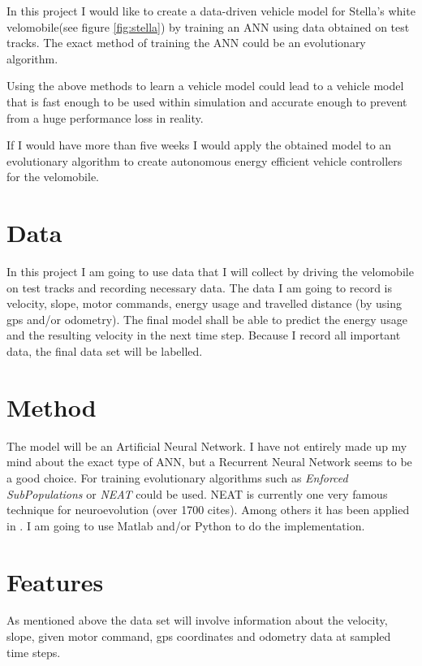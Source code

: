\documentclass[	DIV=calc,%
				paper=a4,%
				fontsize=11pt,%
				twocolumn]{scrartcl}	 %
\begin{document}
	In this project I would like to create a data-driven vehicle model for Stella's white velomobile(see figure \ref{fig:stella}) by training an ANN using data obtained on test tracks.
	The exact method of training the ANN could be an evolutionary algorithm.
	
	Using the above methods to learn a vehicle model could lead to a vehicle model that is fast enough to be used within simulation and accurate enough to prevent from a huge performance loss in reality.
	
	If I would have more than five weeks I would apply the obtained model to an evolutionary algorithm to create autonomous energy efficient vehicle controllers for the velomobile.
	

\section{Data}

    
    In this project I am going to use data that I will collect by driving the velomobile on test tracks and recording necessary data.
    The data I am going to record is velocity, slope, motor commands, energy usage and travelled distance (by using gps and/or odometry).
    The final model shall be able to predict the energy usage and the resulting velocity in the next time step.
    Because I record all important data, the final data set will be labelled.



\section{Method}

	The model will be an Artificial Neural Network. 
	I have not entirely made up my mind about the exact type of ANN, but a Recurrent Neural Network seems to be a good choice.
	For training evolutionary algorithms such as \textit{Enforced SubPopulations} \cite{gomez2003active} or \textit{NEAT}\cite{stanley2002evolving} could be used.
	NEAT is currently one very famous technique for neuroevolution (over 1700 cites).
	Among others it has been applied in \cite{gaier2014evolving}.
	I am going to use Matlab and/or Python to do the implementation.

\section{Features}

	As mentioned above the data set will involve information about the velocity, slope, given motor command, gps coordinates and odometry data at sampled time steps.
\end{document}

